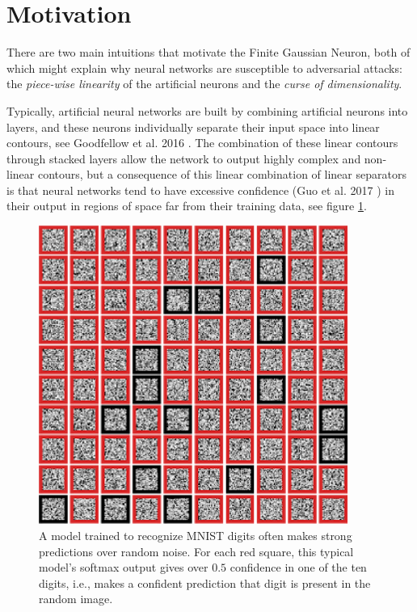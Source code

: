 \documentclass[12pt,oneside]{CUNY_PhD}
\begin{document}
\section{Motivation}
There are two main intuitions that motivate the Finite Gaussian Neuron, both of which might explain why neural networks are susceptible to adversarial attacks: the \emph{piece-wise linearity} of the artificial neurons and the \emph{curse of dimensionality}.

Typically, artificial neural networks are built by combining artificial neurons into layers, and these neurons individually separate their input space into linear contours, see Goodfellow et al. 2016 \cite{goodfellow2016deep}. The combination of these linear contours through stacked layers allow the network to output highly complex and non-linear contours, but a consequence of this linear combination of linear separators is that neural networks tend to have excessive confidence (Guo et al. 2017 \cite{guo2017calibration}) in their output in regions of space far from their training data, see figure \ref{fig:mot-pred-noise}.
\begin{figure}[!t]
    \centering
    \includegraphics[width=0.9\textwidth]{images/Motivation/pred_noise.png}
    \caption{A model trained to recognize MNIST digits often makes strong predictions over random noise. For each red square, this typical model's softmax output gives over $0.5$ confidence in one of the ten digits, i.e., makes a confident prediction that digit is present in the random image.}
    \label{fig:mot-pred-noise}
\end{figure}
\end{document}
